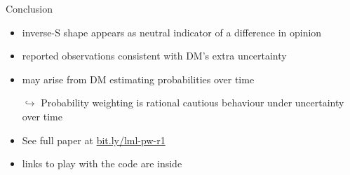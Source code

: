 \begin{frame}{Conclusion}
\begin{itemize}
  \item inverse-S shape appears as neutral indicator of a difference in opinion
	\item reported observations consistent with DM's extra uncertainty
	\item may arise from DM estimating probabilities over time
  \item[$\hookrightarrow$] Probability weighting is rational cautious behaviour under uncertainty over time
  \item[]
  \item See full paper at \url{bit.ly/lml-pw-r1}
  \item links to play with the code are inside
\end{itemize}

\end{frame}
